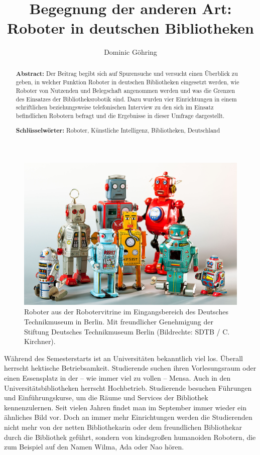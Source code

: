 \documentclass[a4paper,
fontsize=11pt,
oneside,
numbers=noperiodatend,
parskip=half-,
bibliography=totoc,
final
]{scrartcl}
\title{\LARGE{Begegnung der anderen Art: Roboter in deutschen Bibliotheken}}%
\author{Dominic Göhring} %
\date{}
\begin{document}
\maketitle
\thispagestyle{fancyplain} 

\begin{abstract}
\noindent
\textbf{Abstract:} Der Beitrag begibt sich auf Spurensuche und versucht einen Überblick zu
geben, in welcher Funktion Roboter in deutschen Bibliotheken eingesetzt
werden, wie Roboter von Nutzenden und Belegschaft angenommen werden und
was die Grenzen des Einsatzes der Bibliotheksrobotik sind. Dazu wurden
vier Einrichtungen in einem schriftlichen beziehungsweise telefonischen
Interview zu den sich im Einsatz befindlichen Robotern befragt und die
Ergebnisse in dieser Umfrage dargestellt.

\noindent\textbf{Schlüsselwörter:} Roboter, Künstliche Intelligenz, Bibliotheken,
Deutschland
\end{abstract}


\begin{figure}[]
\centering
\includegraphics[width=.7\textwidth]{img/Robotervitrine.jpg}
\caption{Roboter aus der Robotervitrine im Eingangsbereich des Deutsches
Technikmuseum in Berlin. Mit freundlicher Genehmigung der Stiftung Deutsches Technikmuseum Berlin (Bildrechte: SDTB / C. Kirchner).}
\end{figure}

Während des Semesterstarts ist an Universitäten bekanntlich viel los.
Überall herrscht hektische Betriebsamkeit. Studierende suchen ihren
Vorlesungsraum oder einen Essensplatz in der -- wie immer viel zu vollen
-- Mensa. Auch in den Universitätsbibliotheken herrscht Hochbetrieb.
Studierende besuchen Führungen und Einführungskurse, um die Räume und
Services der Bibliothek kennenzulernen. Seit vielen Jahren findet man im
September immer wieder ein ähnliches Bild vor. Doch an immer mehr
Einrichtungen werden die Studierenden nicht mehr von der netten
Bibliothekarin oder dem freundlichen Bibliothekar durch die Bibliothek
geführt, sondern von kindsgroßen humanoiden Robotern, die zum Beispiel
auf den Namen Wilma, Ada oder Nao hören.
\end{document}

